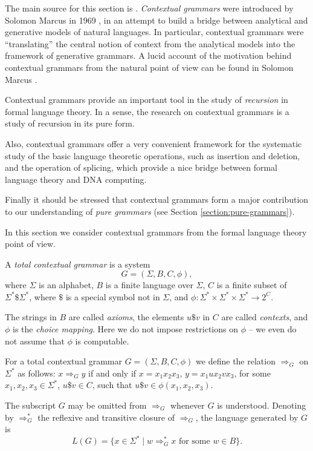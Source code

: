 The main source for this section is \cite{EhPaRo1997contextual}. \emph{Contextual grammars} were introduced by Solomon Marcus in 1969 \cite{M69}, in an attempt to build a bridge between analytical and generative models of natural languages. In particular, contextual grammars were ``translating'' the central notion of context from the analytical models into the framework of generative grammars. A lucid account of the motivation behind contextual grammars from the natural point of view can be found in Solomon Marcus \cite{Ma1997contextual}.

Contextual grammars provide an important tool in the study of \emph{recursion} in formal language theory. In a sense, the research on contextual grammars is a study of recursion in its pure form.

Also, contextual grammars offer a very convenient framework for the systematic study of the basic language theoretic operations, such as insertion and deletion, and the operation of splicing, which provide a nice bridge between formal language theory and DNA computing.

Finally it should be stressed that contextual grammars form a major contribution to our understanding of \emph{pure grammars} (see Section \ref{section:pure-grammars}).

In this section we consider contextual grammars from the formal language theory point of view.

A \emph{total contextual grammar} is a system
$$G = (\Sigma, B, C, \phi),$$
where $\Sigma$ is an alphabet, $B$ is a finite language over $\Sigma$, $C$ is a finite subset of $\Sigma^* \$ \Sigma^*$, where $\$$ is a special symbol not in $\Sigma$, and $\phi: \Sigma^* \times \Sigma^* \times \Sigma^* \to 2^C$.

The strings in $B$ are called \emph{axioms}, the elements $u \$ v$ in $C$ are called \emph{contexts}, and $\phi$ is the \emph{choice mapping}. Here we do not impose restrictions on $\phi$ -- we even do not assume that $\phi$ is computable.

For a total contextual grammar $G = (\Sigma, B, C, \phi)$ we define the relation $\Rightarrow_G$ on $\Sigma^*$ as follows: $x \Rightarrow_G y$ if and only if $x = x_1 x_2 x_3$, $y = x_1 u x_2 v x_3$, for some $x_1, x_2, x_3 \in \Sigma^*$, $u \$ v \in C$, such that $u \$ v \in \phi(x_1, x_2, x_3)$.

The subscript $G$ may be omitted from $\Rightarrow_G$ whenever $G$ is understood. Denoting by $\Rightarrow^*_G$ the reflexive and transitive closure of $\Rightarrow_G$, the language generated by $G$ is
$$L(G) = \{x \in \Sigma^* \mid w \Rightarrow^*_G x \text{ for some } w \in B\}.$$

